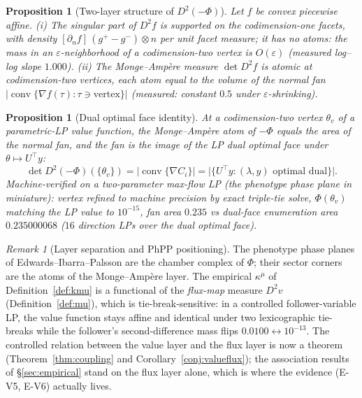 \documentclass[11pt,a4paper]{article}
\theoremstyle{plain}
\newtheorem{proposition}[theorem]{Proposition}
\theoremstyle{definition}
\theoremstyle{remark}
\newtheorem{remark}[theorem]{Remark}
\newcommand{\kmu}{\kappa^{\mu}}
\begin{document}
\begin{proposition}[Two-layer structure of $D^2(-\Phi)$]\label{prop:twolayer}
Let $f$ be convex piecewise affine. (i) The singular part of $D^2 f$ is
supported on the codimension-one facets, with density
$[\partial_n f]\,(g^+ - g^-) \otimes n$ per unit facet measure; it has no
atoms: the mass in an $\varepsilon$-neighborhood of a codimension-two
vertex is $O(\varepsilon)$ (measured log--log slope $1.000$). (ii) The
Monge--Amp\`ere measure $\det D^2 f$ is atomic at codimension-two
vertices, each atom equal to the volume of the normal fan
$|\operatorname{conv}\{\nabla f(\tau) : \tau \ni \text{vertex}\}|$
(measured: constant $0.5$ under $\varepsilon$-shrinking).
\end{proposition}

\begin{proposition}[Dual optimal face identity]\label{prop:dualface}
At a codimension-two vertex $\theta_v$ of a parametric-LP value function,
the Monge--Amp\`ere atom of $-\Phi$ equals the area of the normal fan, and
the fan is the image of the LP dual optimal face under
$\theta \mapsto U^\top y$:
\[
\det D^2(-\Phi)(\{\theta_v\})
= \bigl|\operatorname{conv}\{\nabla C_i\}\bigr|
= \bigl|\{U^\top y : (\lambda, y) \text{ optimal dual}\}\bigr|.
\]
Machine-verified on a two-parameter max-flow LP (the phenotype phase
plane in miniature): vertex refined to machine precision by exact
triple-tie solve, $\Phi(\theta_v)$ matching the LP value to
$10^{-15}$, fan area $0.235$ vs dual-face enumeration area
$0.235000068$ ($16$ direction LPs over the dual optimal face).
\end{proposition}

\begin{remark}[Layer separation and PhPP positioning]\label{rem:layersep}
The phenotype phase planes of Edwards--Ibarra--Palsson
\citep{edwards2001, ibarra2002} are the chamber
complex of $\Phi$; their sector corners are the atoms of the
Monge--Amp\`ere layer. The empirical $\kmu$ of
Definition~\ref{def:kmu} is a functional of the \emph{flux-map} measure
$D^2 v$ (Definition~\ref{def:mu}), which is tie-break-sensitive: in a
controlled follower-variable LP, the value function stays affine and
identical under two lexicographic tie-breaks while the follower's
second-difference mass flips $0.0100 \leftrightarrow 10^{-13}$. The
controlled relation between the value layer and the flux layer is now
a theorem (Theorem~\ref{thm:coupling} and
Corollary~\ref{conj:valueflux}); the association results of
\S\ref{sec:empirical} stand on the flux layer alone, which is where
the evidence (E-V5, E-V6) actually lives.
\end{remark}
\end{document}
